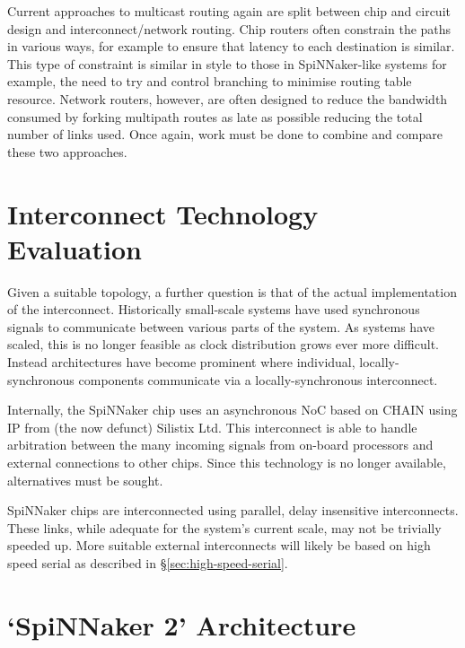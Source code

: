		Current approaches to multicast routing again are split between chip and
		circuit design and interconnect/network routing. Chip routers often
		constrain the paths in various ways, for example to ensure that latency to
		each destination is similar. This type of constraint is similar in style to
		those in SpiNNaker-like systems for example, the need to try and control
		branching to minimise routing table resource. Network routers, however, are
		often designed to reduce the bandwidth consumed by forking multipath routes
		as late as possible reducing the total number of links used. Once again,
		work must be done to combine and compare these two approaches.
	
	\section{Interconnect Technology Evaluation}
		
		
		Given a suitable topology, a further question is that of the actual
		implementation of the interconnect. Historically small-scale systems have
		used synchronous signals to communicate between various parts of the system.
		As systems have scaled, this is no longer feasible as clock distribution
		grows ever more difficult. Instead architectures have become prominent where
		individual, locally-synchronous components communicate via a
		locally-synchronous interconnect.
		
		Internally, the SpiNNaker chip uses an asynchronous NoC based on CHAIN
		\cite{plana07,bainbridge02} using IP from (the now defunct) Silistix Ltd.
		This interconnect is able to handle arbitration between the many incoming
		signals from on-board processors and external connections to other chips.
		Since this technology is no longer available, alternatives must be sought.
		
		SpiNNaker chips are interconnected using parallel, delay insensitive
		interconnects. These links, while adequate for the system's current scale,
		may not be trivially speeded up. More suitable external interconnects will
		likely be based on high speed serial as described in
		\S\ref{sec:high-speed-serial}.
		
		\section{`SpiNNaker 2' Architecture}
		
